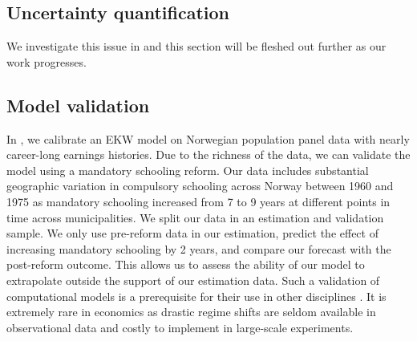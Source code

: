 \subsection{Uncertainty quantification}

We investigate this issue in \citet{Gabler.2020b} and this section will be fleshed out further as our work progresses.

\subsection{Model validation}

In \citet{Bhuller.2018}, we calibrate an EKW model on Norwegian population panel data with nearly career-long earnings histories. Due to the richness of the data, we can validate the model using a mandatory schooling reform. Our data includes substantial geographic variation in compulsory schooling across Norway between 1960 and 1975 as mandatory schooling increased from 7 to 9 years at different points in time across municipalities. We split our data in an estimation and validation sample. We only use pre-reform data in our estimation, predict the effect of increasing mandatory schooling by 2 years, and compare our forecast with the post-reform outcome. This allows us to assess the ability of our model to extrapolate outside the support of our estimation data. Such a validation of computational models is a prerequisite for their use in other disciplines \citep{Adams.2012,Oberkampf.2010}. It is extremely rare in economics as drastic regime shifts are seldom available in observational data and costly to implement in large-scale experiments.

